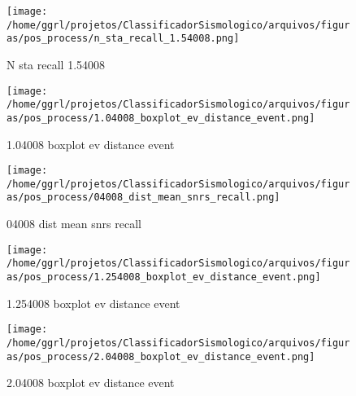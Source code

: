                     \begin{figure}[H]
                        \centering
                        \texttt{[image: /home/ggrl/projetos/ClassificadorSismologico/arquivos/figuras/pos\_process/n\_sta\_recall\_1.54008.png]}
                        \caption{N sta recall 1.54008}
                        \label{fig:n_sta_recall_1.54008}
                    \end{figure}
                

                    \begin{figure}[H]
                        \centering
                        \texttt{[image: /home/ggrl/projetos/ClassificadorSismologico/arquivos/figuras/pos\_process/1.04008\_boxplot\_ev\_distance\_event.png]}
                        \caption{1.04008 boxplot ev distance event}
                        \label{fig:1.04008_boxplot_ev_distance_event}
                    \end{figure}
                

                    \begin{figure}[H]
                        \centering
                        \texttt{[image: /home/ggrl/projetos/ClassificadorSismologico/arquivos/figuras/pos\_process/04008\_dist\_mean\_snrs\_recall.png]}
                        \caption{04008 dist mean snrs recall}
                        \label{fig:04008_dist_mean_snrs_recall}
                    \end{figure}
                

                    \begin{figure}[H]
                        \centering
                        \texttt{[image: /home/ggrl/projetos/ClassificadorSismologico/arquivos/figuras/pos\_process/1.254008\_boxplot\_ev\_distance\_event.png]}
                        \caption{1.254008 boxplot ev distance event}
                        \label{fig:1.254008_boxplot_ev_distance_event}
                    \end{figure}
                

                    \begin{figure}[H]
                        \centering
                        \texttt{[image: /home/ggrl/projetos/ClassificadorSismologico/arquivos/figuras/pos\_process/2.04008\_boxplot\_ev\_distance\_event.png]}
                        \caption{2.04008 boxplot ev distance event}
                        \label{fig:2.04008_boxplot_ev_distance_event}
                    \end{figure}
                

